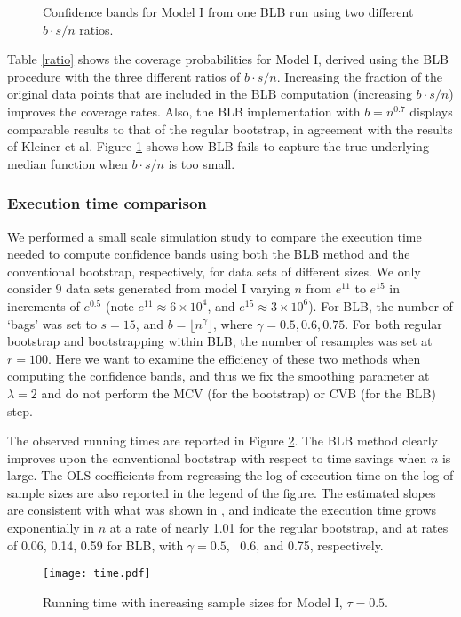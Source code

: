\documentclass{statsoc}
\begin{document}
\begin{figure}[H]
\caption{Confidence bands  {for Model I} from one BLB run using two different $b \cdot s/n$ ratios.} \label{fig:ratio}
\centering   
\end{figure}
Table \ref{ratio} shows the coverage probabilities for Model I, derived using the BLB procedure with the three different ratios of $b \cdot s/n$. Increasing the fraction of the original data points that are included in the BLB computation (increasing $b \cdot s/n$) improves the coverage rates. Also, the BLB implementation with $b=n^{0.7}$ displays comparable results to that of the regular bootstrap, in agreement with  the results of Kleiner et al. Figure \ref{fig:ratio} shows how BLB fails to capture the true underlying median function when $b \cdot s/n$ is too small.

\subsubsection{Execution time comparison}
We performed a small scale simulation study to compare the execution time needed to compute confidence bands using both the BLB method and the conventional bootstrap, respectively, for data sets of different sizes. {We only consider 9 data sets generated from model I varying  $n$ from $e^{11}$ to $e^{15}$ in increments of $e^{0.5}$ (note $e^{11}\approx 6\times 10^4$, and $e^{15}\approx 3\times 10^6$). For BLB, the number of `bags' was set to $s=15$, and $b=\lfloor{n^{\gamma}}\rfloor$, where $\gamma=0.5,0.6,0.75$}.  {For both regular bootstrap and bootstrapping within BLB}, the number of resamples was set at $r=100$. Here we want to examine the efficiency of these two methods when computing the confidence bands, and thus we fix the smoothing parameter at $\lambda=2$ and do not perform the MCV (for the bootstrap) or CVB (for the BLB) step. 

The observed running times are reported in Figure \ref{time}. The BLB method clearly improves upon the conventional bootstrap with respect to time savings when $n$ is large. The OLS coefficients from regressing the log of execution time on the log of sample sizes are also reported in the legend of the figure. The estimated slopes are consistent with what was shown in \citet{koenker2005frisch}, and indicate the execution time grows exponentially in $n$ at a rate of nearly 1.01 for the regular bootstrap, and at rates of 0.06, 0.14, 0.59 for BLB, with $\gamma=0.5,\text{ }0.6$, and 0.75, respectively.
\begin{figure}
\begin{center}
\texttt{[image: time.pdf]}
\caption{Running time with increasing sample sizes for Model I, $\tau=0.5$.}
\label{time}
\end{center}
\end{figure}
\end{document}
